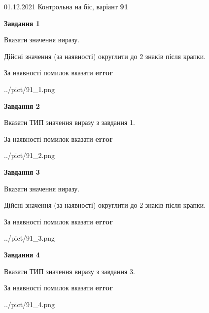 \documentclass[11pt, ukrainian]{article}
\begin{document}
{01.12.2021 Контрольна на біс, варіант  \No \textbf { 91 }\par}
{
\begin {large}
{\begin {center}\textbf{Завдання 1}\end {center}}\par
Вказати значення виразу. \par
Дійсні значення (за наявності) округлити до 2 знаків після крапки. \par
За наявності помилок вказати \textbf{error}

\begin{center}
	{../pict/91_1.png}
\end{center}
\newpage

{\begin {center}\textbf{Завдання 2}\end {center}}\par
Вказати ТИП значення виразу з завдання 1. \par
За наявності помилок вказати \textbf{error}

\begin{center}
	{../pict/91_2.png}
\end{center}
\newpage

{\begin {center}\textbf{Завдання 3}\end {center}}\par
Вказати значення виразу. \par
Дійсні значення (за наявності) округлити до 2 знаків після крапки. \par
За наявності помилок вказати \textbf{error}

\begin{center}
	{../pict/91_3.png}
\end{center}
\newpage

{\begin {center}\textbf{Завдання 4}\end {center}}\par
Вказати ТИП значення виразу з завдання 3. \par
За наявності помилок вказати \textbf{error}

\begin{center}
	{../pict/91_4.png}
\end{center}
\newpage


\end{large}}
\end{document}
